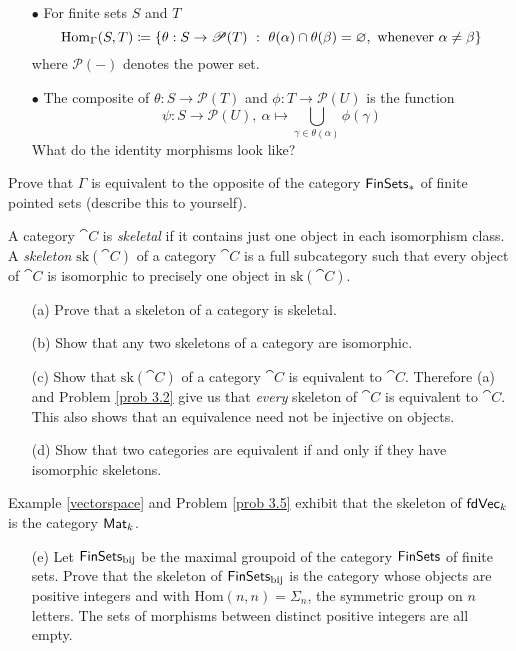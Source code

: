\begin{problem}
\begin{itemize}
\begin{itemize}
\item[$\bullet$] For finite sets $S$ and $T$
\[\mathrm{Hom}_{\Gamma}(S,T) \coloneqq \left\{\theta:S \to \mathscr{P}(T)\ :\ \theta(\alpha)\cap\theta(\beta) = \varnothing,\text{ whenever }\alpha\neq \beta\right\}\]
where $\mathscr{P}(-)$ denotes the power set.
\item[$\bullet$] The composite of $\theta:S \to \mathscr{P}(T)$ and $\phi:T \to \mathscr{P}(U)$ is the function
\[\psi:S \to \mathscr{P}(U),\ \alpha \mapsto \bigcup_{\gamma \in \theta(\alpha)}\phi(\gamma)\]
What do the identity morphisms look like?
\end{itemize}
Prove that $\Gamma$ is equivalent to the opposite of the category $\mathsf{FinSets}_*$ of finite pointed sets (describe this to yourself).
\end{itemize}
\end{problem}

\vspace{0.1in}

\begin{problem}\label{prob 3.7}
A category $\cat{C}$ is \emph{skeletal} if it contains just one object in each isomorphism class. A \emph{skeleton} $\mathrm{sk}(\cat{C})$ of a category $\cat{C}$ is a full subcategory such that every object of $\cat{C}$ is isomorphic to precisely one object in $\mathrm{sk}(\cat{C})$.
\begin{itemize}
\item[(a)] Prove that a skeleton of a category is skeletal.
\item[(b)] Show that any two skeletons of a category are isomorphic.
\item[(c)] Show that $\mathrm{sk}(\cat{C})$ of a category $\cat{C}$ is equivalent to $\cat{C}$. Therefore (a) and Problem \ref{prob 3.2} give us that \emph{every} skeleton of $\cat{C}$ is equivalent to $\cat{C}$. This also shows that an equivalence need not be injective on objects.
\item[(d)] Show that two categories are equivalent if and only if they have isomorphic skeletons.
\end{itemize}
Example \ref{vectorspace} and Problem \ref{prob 3.5} exhibit that the skeleton of $\mathsf{fdVec}_k$ is the category $\mathsf{Mat}_k$.
\begin{itemize}
\item[(e)] Let $\mathsf{FinSets}_{\text{bij}}$ be the maximal groupoid of the category $\mathsf{FinSets}$ of finite sets. Prove that the skeleton of $\mathsf{FinSets}_{\text{bij}}$ is the category whose objects are positive integers and with $\mathrm{Hom}(n, n) = \Sigma_n$, the symmetric group on $n$ letters. The sets of morphisms between distinct positive integers are all empty.
\end{itemize}
\end{problem}